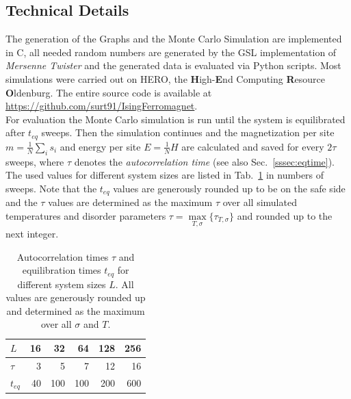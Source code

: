 \subsection{Technical Details}
    The generation of the Graphs and the Monte Carlo Simulation are implemented
    in C, all needed random numbers are generated by the GSL \cite{GSL}
    implementation of \emph{Mersenne Twister} \cite{Matsumoto1998} and
    the generated data is evaluated via Python scripts.
    Most simulations were carried out on HERO, the \textbf{H}igh-\textbf{E}nd
    Computing \textbf{R}esource \textbf{O}ldenburg.
    The entire source code is available at \url{https://github.com/surt91/IsingFerromagnet}.\\

    For evaluation the Monte Carlo simulation is run until the system
    is equilibrated after \(t_{eq}\) sweeps. Then the simulation continues
    and the magnetization per site \(m=\frac{1}{N}\sum_i s_i\) and energy
    per site \(E=\frac{1}{N} H\) are calculated and saved for every
    \(2\tau\) sweeps, where \(\tau\) denotes the \emph{autocorrelation time}
    (see also Sec.\ \ref{sssec:eqtime}). The used values for different system sizes
    are listed in Tab.\ \ref{tab:tauAndTeq} in numbers of sweeps. Note that
    the \(t_{eq}\) values are generously rounded up to be on the safe side
    and the \(\tau\) values are determined as the maximum \(\tau\) over all
    simulated temperatures and disorder parameters \(\tau = \underset{T,\sigma}{\max} \{\tau_{T,\sigma}\}\)
    and rounded up to the next integer.
    \begin{table}[htbp]
        \center
        \begin{tabular}{l r r r r r}
            \toprule
            \(L\)    & 16 &  32 &  64 & 128 & 256\\
            \midrule
            \(\tau\) &  3 &   5 &   7 &  12 &  16\\
            \(t_{eq}\) & 40 & 100 & 100 & 200 & 600\\
            \bottomrule
        \end{tabular}
        \caption[Autocorrelation Times $\tau$ and Equilibration Times
            $t_{eq}$ for Different System Sizes $L$]{
            Autocorrelation times $\tau$ and equilibration times
            $t_{eq}$ for different system sizes $L$. All values are generously
            rounded up and determined as the maximum over all \(\sigma\) and \(T\).
        }
        \label{tab:tauAndTeq}
    \end{table}\\
